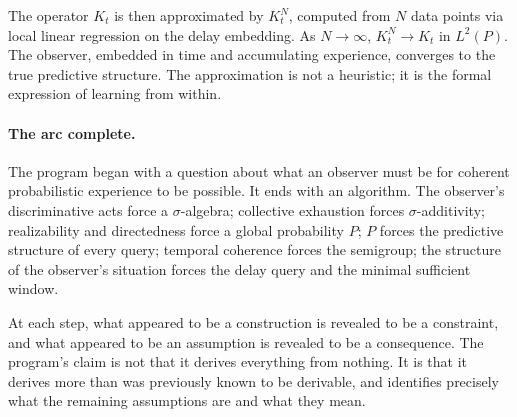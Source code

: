 The operator $K_t$ is then approximated by $K_t^N$, computed from $N$
data points via local linear regression on the delay embedding.  As
$N \to \infty$, $K_t^N \to K_t$ in $L^2(P)$.  The observer, embedded
in time and accumulating experience, converges to the true predictive
structure.  The approximation is not a heuristic; it is the formal
expression of learning from within.

\medskip

\paragraph{The arc complete.}
The program began with a question about what an observer must be for
coherent probabilistic experience to be possible.  It ends with an
algorithm.  The observer's discriminative acts force a $\sigma$-algebra;
collective exhaustion forces $\sigma$-additivity; realizability and
directedness force a global probability $P$; $P$ forces the predictive
structure of every query; temporal coherence forces the semigroup; the
structure of the observer's situation forces the delay query and the
minimal sufficient window.

At each step, what appeared to be a construction is revealed to be a
constraint, and what appeared to be an assumption is revealed to be a
consequence.  The program's claim is not that it derives everything
from nothing.  It is that it derives more than was previously known to
be derivable, and identifies precisely what the remaining assumptions
are and what they mean.
